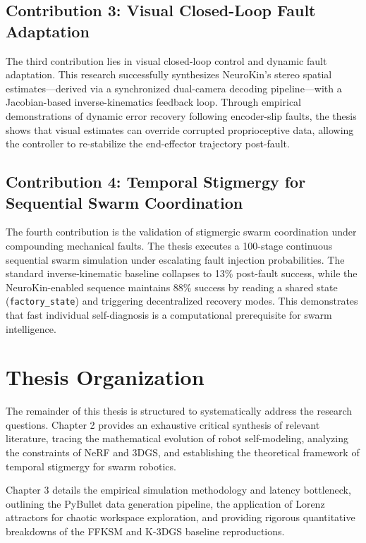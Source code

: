 \documentclass[12pt,a4paper,oneside]{report}
\begin{document}
\subsection{Contribution 3: Visual Closed-Loop Fault Adaptation}

The third contribution lies in visual closed-loop control and dynamic fault adaptation. This research successfully synthesizes NeuroKin's stereo spatial estimates—derived via a synchronized dual-camera decoding pipeline—with a Jacobian-based inverse-kinematics feedback loop. Through empirical demonstrations of dynamic error recovery following encoder-slip faults, the thesis shows that visual estimates can override corrupted proprioceptive data, allowing the controller to re-stabilize the end-effector trajectory post-fault.

\subsection{Contribution 4: Temporal Stigmergy for Sequential Swarm Coordination}

The fourth contribution is the validation of stigmergic swarm coordination under compounding mechanical faults. The thesis executes a 100-stage continuous sequential swarm simulation under escalating fault injection probabilities. The standard inverse-kinematic baseline collapses to 13\% post-fault success, while the NeuroKin-enabled sequence maintains 88\% success by reading a shared state (\texttt{factory\_state}) and triggering decentralized recovery modes. This demonstrates that fast individual self-diagnosis is a computational prerequisite for swarm intelligence.

\section{Thesis Organization}

The remainder of this thesis is structured to systematically address the research questions. Chapter 2 provides an exhaustive critical synthesis of relevant literature, tracing the mathematical evolution of robot self-modeling, analyzing the constraints of NeRF and 3DGS, and establishing the theoretical framework of temporal stigmergy for swarm robotics.

Chapter 3 details the empirical simulation methodology and latency bottleneck, outlining the PyBullet data generation pipeline, the application of Lorenz attractors for chaotic workspace exploration, and providing rigorous quantitative breakdowns of the FFKSM and K-3DGS baseline reproductions.
\end{document}
